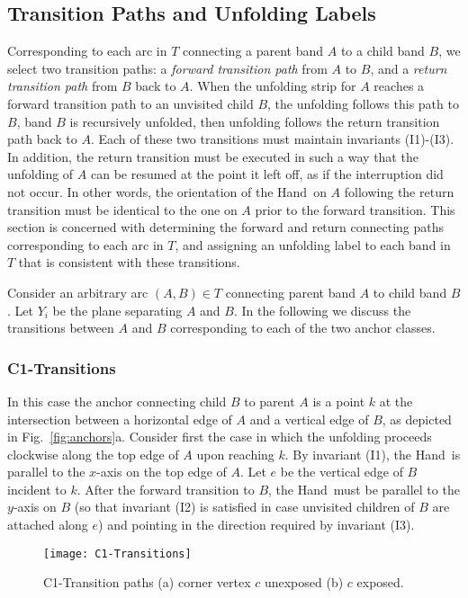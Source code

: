 \documentclass[11pt]{article}
\newcommand\hand{{\sc Hand}}
\begin{document}
\subsection{Transition Paths and Unfolding Labels}
\label{sec:transitions}
Corresponding to each arc in $T$ connecting a parent band $A$ to a child band $B$, we select two transition paths: a \emph{forward transition path} from $A$ to $B$, and a \emph{return transition path} from $B$ back to $A$. When the unfolding strip for $A$ reaches a forward transition path to an unvisited child $B$, the unfolding follows this path to $B$, band $B$ is recursively unfolded, then unfolding follows the return transition path back to $A$. Each of these two transitions must maintain invariants (I1)-(I3). In addition, the return transition must be executed in such a way that the unfolding of $A$ can be resumed at the point it left off, as if the interruption did not occur. In other words, the orientation of the \hand\ on $A$ following the return transition must be identical to the one on $A$ prior to the forward transition.
This section is concerned with determining the forward and return connecting paths corresponding to each arc in $T$, and assigning an unfolding label to each band in $T$ that is consistent with these transitions.

Consider an arbitrary arc $(A, B) \in T$ connecting parent band $A$ to child band $B$. Let $Y_i$ be
the plane separating $A$ and $B$. In the following we discuss the transitions between $A$ and $B$ corresponding 
to each of the two anchor classes.

\subsubsection{C1-Transitions}
\label{sec:C1}
In this case the anchor connecting child $B$ to parent $A$ is a point $k$ at the intersection between a horizontal edge of $A$ and a vertical edge of $B$, as depicted in Fig.~\ref{fig:anchors}a. Consider first the case in which the unfolding proceeds clockwise along the top edge of $A$ upon reaching $k$.
By invariant (I1), the \hand\ is parallel to the $x$-axis on the top edge of $A$. Let $e$ be the vertical edge of $B$ incident to $k$. After the forward transition to $B$, the \hand\ must be parallel to the $y$-axis on $B$ (so that invariant (I2) is satisfied in case unvisited children of $B$ are attached along $e$) and pointing in the direction required by invariant (I3).

\begin{figure}[htpb]
\centering
\texttt{[image: C1-Transitions]}
\caption{C1-Transition paths (a) corner vertex $c$ unexposed (b) $c$ exposed.}
\label{fig:C1-transitions}
\end{figure}
\end{document}
